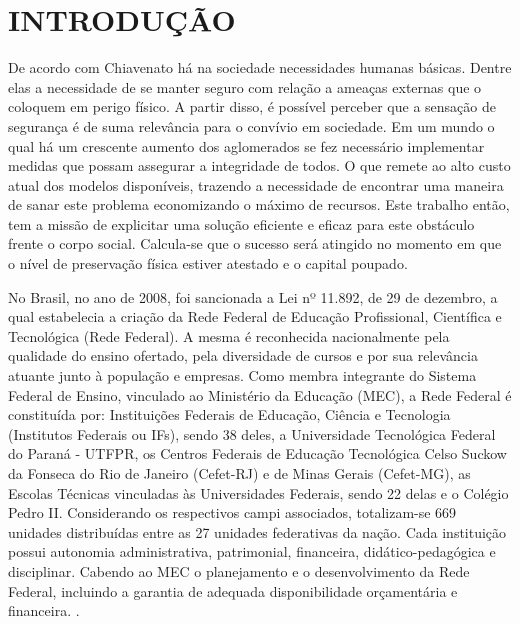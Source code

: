 \chapter{INTRODUÇÃO}
\label{cap:introducao}

De acordo com Chiavenato \cite{chiavenato2003introducao} há na sociedade necessidades humanas básicas.
Dentre elas a necessidade de se manter seguro com relação a ameaças externas
que o coloquem em perigo físico. A partir disso, é possível perceber que a sensação
de segurança é de suma relevância para o convívio em sociedade. Em um mundo o qual há um crescente
aumento dos aglomerados se fez necessário implementar medidas que possam assegurar a
integridade de todos. O que remete ao alto custo atual dos modelos disponíveis, trazendo a necessidade
de encontrar uma maneira de sanar este problema economizando o máximo de recursos. Este trabalho então, tem a missão de explicitar uma solução eficiente e eficaz para este obstáculo frente o corpo social. Calcula-se que o sucesso será atingido no momento em que
o nível de preservação física estiver atestado e o capital poupado.



No Brasil, no ano de 2008, foi sancionada a Lei nº 11.892, de 29 de dezembro, a qual estabelecia a criação da Rede Federal de Educação Profissional, Científica e Tecnológica (Rede Federal). A mesma é reconhecida nacionalmente pela qualidade do ensino ofertado, pela diversidade de cursos e por sua relevância atuante junto à população e empresas. Como membra integrante do Sistema Federal de Ensino, vinculado ao Ministério da Educação (MEC), a Rede Federal é constituída por: Instituições Federais de Educação, Ciência e Tecnologia (Institutos Federais ou IFs), sendo 38 deles, a Universidade Tecnológica Federal do Paraná - UTFPR, os Centros Federais de Educação Tecnológica Celso Suckow da Fonseca do Rio de Janeiro (Cefet-RJ) e de Minas Gerais (Cefet-MG), as Escolas Técnicas vinculadas às Universidades Federais, sendo 22 delas e o Colégio Pedro II. Considerando os respectivos campi associados, totalizam-se 669 unidades distribuídas entre as 27 unidades federativas da nação. Cada instituição possui autonomia administrativa,  patrimonial, financeira, didático-pedagógica e disciplinar. Cabendo ao MEC o planejamento e o desenvolvimento da Rede Federal, incluindo a garantia de adequada disponibilidade orçamentária e financeira. \cite{redefederal}.




